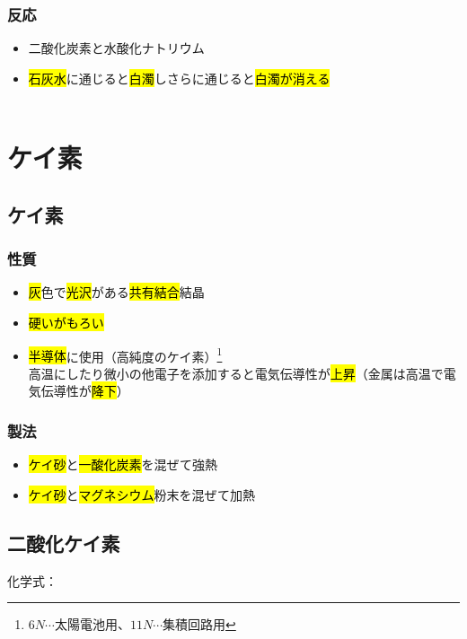  \subsubsection{反応}
 \begin{itemize}
  \item 二酸化炭素と水酸化ナトリウム\\
  \item \hl{石灰水}に通じると\hl{白濁}しさらに通じると\hl{白濁が消える}\\
  \\
 \end{itemize}
 \section{ケイ素}
 \subsection{ケイ素}
 \subsubsection{性質}
 \begin{itemize}
  \item \hl{灰}色で\hl{光沢}がある\hl{共有結合}結晶
  \item \hl{硬いがもろい}
  \item \hl{半導体}に使用（高純度のケイ素）\footnote{$6N\cdots$太陽電池用、$11N\cdots$集積回路用}\\
  高温にしたり微小の他電子を添加すると電気伝導性が\hl{上昇}（金属は高温で電気伝導性が\hl{降下}）
 \end{itemize}
 \subsubsection{製法}
 \begin{itemize}
  \item \hl{ケイ砂}と\hl{一酸化炭素}を混ぜて強熱 \K\\
  \item \hl{ケイ砂}と\hl{マグネシウム}粉末を混ぜて加熱\\
 \end{itemize}
 \subsection{二酸化ケイ素}
 化学式：\hl{}
